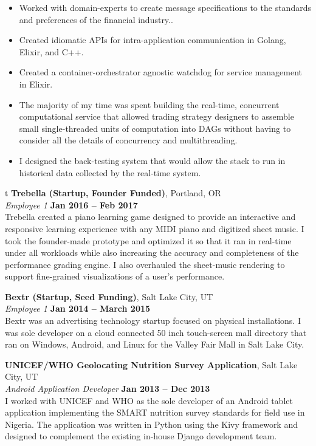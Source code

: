 \documentclass[margin,line]{resume}
\begin{document}
\begin{resume}
    \begin{itemize}
    \item Worked with domain-experts to create message specifications to the standards and preferences of the financial industry..
    \item Created idiomatic APIs for intra-application communication in Golang, Elixir, and C++.
    \item Created a container-orchestrator agnostic watchdog for service management in Elixir.
    \item The majority of my time was spent building the real-time, concurrent computational service that allowed trading strategy designers to assemble small single-threaded units of computation into DAGs without having to consider all the details of concurrency and multithreading.
    \item I designed the back-testing system that would allow the stack to run in historical data collected by the real-time system. 
    \end{itemize}
\bgroup\obeylines
t
\egroup
    \textbf{Trebella (Startup, Founder Funded)}, Portland, OR \vspace{2mm}\\\vspace{1mm}%
    \textsl{Employee 1} \hfill \textbf{Jan 2016 -- Feb 2017}\\
Trebella created a piano learning game designed to provide an interactive and responsive learning experience with any MIDI piano and digitized sheet music. I took the founder-made prototype and optimized it so that it ran in real-time under all workloads while also increasing the accuracy and completeness of the performance grading engine. I also overhauled the sheet-music rendering to support fine-grained visualizations of a user's performance.


    \textbf{Bextr (Startup, Seed Funding)}, Salt Lake City, UT \vspace{2mm}\\\vspace{1mm}%
    \textsl{Employee 1} \hfill \textbf{Jan 2014 -- March 2015}\\
Bextr was an advertising technology startup focused on physical installations. I was sole developer on a cloud connected 50 inch touch-screen mall directory that ran on Windows, Android, and Linux for the Valley Fair Mall in Salt Lake City.

    \textbf{UNICEF/WHO Geolocating Nutrition Survey Application}, Salt Lake City, UT \vspace{2mm}\\\vspace{1mm}%
    \textsl{Android Application Developer} \hfill \textbf{Jan 2013 -- Dec 2013}\\
I worked with UNICEF and WHO as the sole developer of an Android tablet application implementing the SMART nutrition survey standards for field use in Nigeria. The application was written in Python using the Kivy framework and designed to complement the existing in-house Django development team.


\end{resume}
\end{document}
